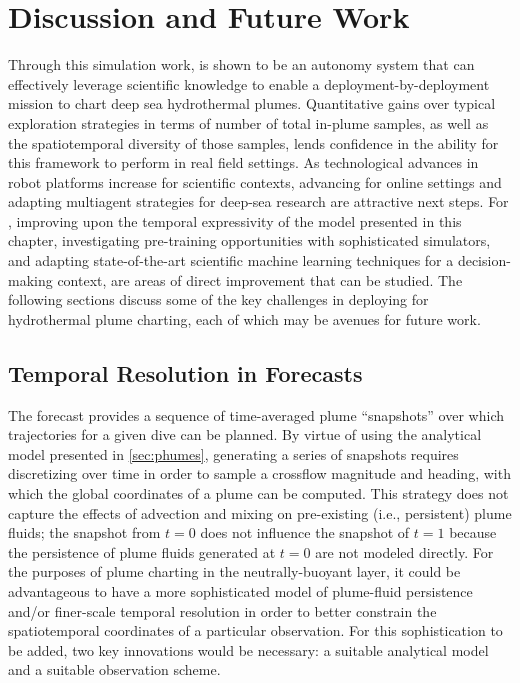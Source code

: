 \section{Discussion and Future Work}
\label{sec:future}
Through this simulation work, \PHORTEX is shown to be an autonomy system that can effectively leverage scientific knowledge to enable a deployment-by-deployment mission to chart deep sea hydrothermal plumes. Quantitative gains over typical exploration strategies in terms of number of total in-plume samples, as well as the spatiotemporal diversity of those samples, lends confidence in the ability for this framework to perform in real field settings. As technological advances in robot platforms increase for scientific contexts, advancing \PHORTEX for online settings and adapting multiagent strategies for deep-sea research are attractive next steps. For \PHUMES, improving upon the temporal expressivity of the model presented in this chapter, investigating pre-training opportunities with sophisticated simulators, and adapting state-of-the-art scientific machine learning techniques for a decision-making context, are areas of direct improvement that can be studied. The following sections discuss some of the key challenges in deploying \PHORTEX for hydrothermal plume charting, each of which may be avenues for future work.

\subsection{Temporal Resolution in \PHUMES Forecasts}
The \PHUMES forecast provides a sequence of time-averaged plume ``snapshots'' over which trajectories for a given dive can be planned. By virtue of using the analytical model presented in \cref{sec:phumes}, generating a series of snapshots requires discretizing over time in order to sample a crossflow magnitude and heading, with which the global coordinates of a plume can be computed. This strategy does not capture the effects of advection and mixing on pre-existing (i.e., persistent) plume fluids; the snapshot from $t=0$ does not influence the snapshot of $t=1$ because the persistence of plume fluids generated at $t=0$ are not modeled directly. For the purposes of plume charting in the neutrally-buoyant layer, it could be advantageous to have a more sophisticated model of plume-fluid persistence and/or finer-scale temporal resolution in order to better constrain the spatiotemporal coordinates of a particular observation. For this sophistication to be added, two key innovations would be necessary: a suitable analytical model and a suitable observation scheme.

